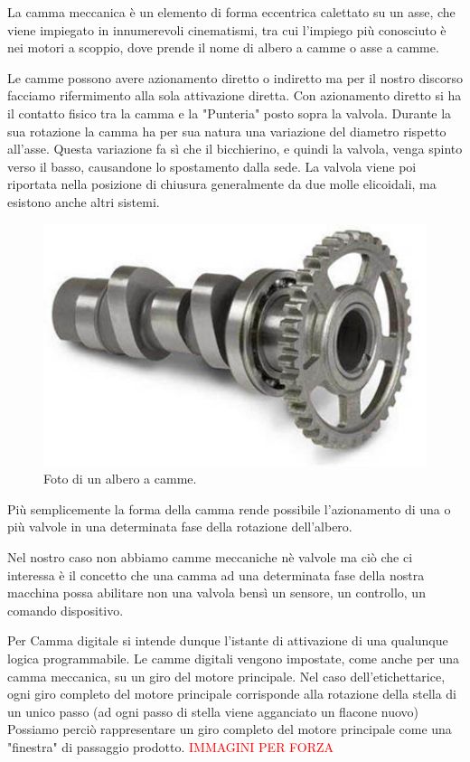 \documentclass[12pt, a4paper, oneside]{book}
\begin{document}
La camma meccanica è un elemento di forma eccentrica calettato su un asse, che viene impiegato in innumerevoli cinematismi, tra cui l'impiego più conosciuto è nei motori a scoppio, dove prende il nome di albero a camme o asse a camme.

Le camme possono avere azionamento diretto o indiretto ma per il nostro discorso facciamo rifermimento alla sola attivazione diretta.
Con azionamento diretto si ha il contatto fisico tra la camma e la "Punteria" posto sopra la valvola. Durante la sua rotazione la camma ha per sua natura una variazione del diametro rispetto all'asse. Questa variazione fa sì che il bicchierino, e quindi la valvola, venga spinto verso il basso, causandone lo spostamento dalla sede. La valvola viene poi riportata nella posizione di chiusura generalmente da due molle elicoidali, ma esistono anche altri sistemi.

\begin{figure}[H]
	\centering
	\includegraphics[width=12cm]{Immagini/camme}
	\caption{ Foto di un albero a camme.}
\end{figure}

Più semplicemente la forma della camma rende possibile l'azionamento di una o più valvole in una determinata fase della rotazione dell'albero. 

Nel nostro caso non abbiamo camme meccaniche nè valvole ma ciò che ci interessa è il concetto che una camma ad una determinata fase della nostra macchina possa abilitare non una valvola bensì un sensore, un controllo, un comando dispositivo.

Per Camma digitale si intende dunque l'istante di attivazione di una qualunque logica programmabile. Le camme digitali vengono impostate, come anche per una camma meccanica, su un giro del motore principale.
Nel caso dell'etichettarice, ogni giro completo del motore principale corrisponde alla rotazione della stella di un unico passo (ad ogni passo di stella viene agganciato un flacone nuovo)
Possiamo perciò rappresentare un giro completo del motore principale come una "finestra" di passaggio prodotto. \textcolor{red}{IMMAGINI PER FORZA}
\end{document}
